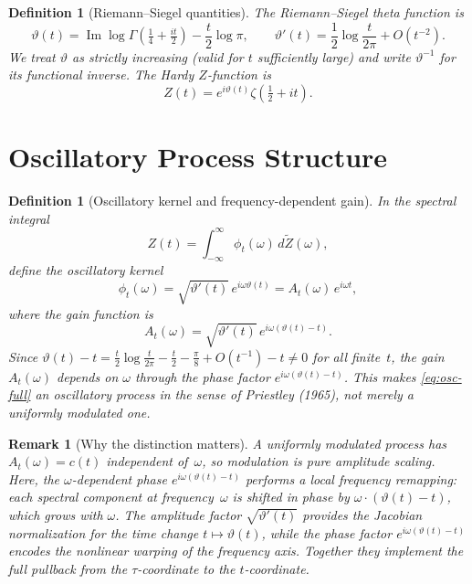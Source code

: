 \documentclass[11pt,a4paper]{article}
\newtheorem{definition}[theorem]{Definition}
\newtheorem{remark}[theorem]{Remark}
\begin{document}
\begin{definition}[Riemann--Siegel quantities]
\label{def:rs}
The Riemann--Siegel theta function is
\begin{equation}
  \vartheta(t)=\operatorname{Im}\log\Gamma\!\left(\tfrac{1}{4}+\tfrac{it}{2}\right)
  -\frac{t}{2}\log\pi,
  \qquad
  \vartheta'(t)=\frac{1}{2}\log\frac{t}{2\pi}+O(t^{-2}).
\end{equation}
We treat $\vartheta$ as strictly increasing (valid for $t$ sufficiently
large) and write $\vartheta^{-1}$ for its functional inverse.
The Hardy $Z$-function is
\begin{equation}
  Z(t)=e^{i\vartheta(t)}\zeta\!\left(\tfrac{1}{2}+it\right).
\end{equation}
\end{definition}


\section{Oscillatory Process Structure}

\begin{definition}[Oscillatory kernel and frequency-dependent gain]
\label{def:oscillatory}
In the spectral integral
\begin{equation}
  \label{eq:osc-full}
  Z(t)=\int_{-\infty}^{\infty}
       \phi_t(\omega)\,d\widetilde{Z}(\omega),
\end{equation}
define the \emph{oscillatory kernel}
\begin{equation}
  \label{eq:phi-def}
  \phi_t(\omega)
  =\sqrt{\vartheta'(t)}\,e^{i\omega\vartheta(t)}
  =A_t(\omega)\,e^{i\omega t},
\end{equation}
where the \emph{gain function} is
\begin{equation}
  \label{eq:gain}
  A_t(\omega)=\sqrt{\vartheta'(t)}\,e^{i\omega(\vartheta(t)-t)}.
\end{equation}
Since $\vartheta(t)-t=\tfrac{t}{2}\log\tfrac{t}{2\pi}-\tfrac{t}{2}
-\tfrac{\pi}{8}+O(t^{-1})-t\neq 0$ for all finite~$t$, the gain
$A_t(\omega)$ depends on $\omega$ through the phase factor
$e^{i\omega(\vartheta(t)-t)}$. This makes \eqref{eq:osc-full} an
\emph{oscillatory process} in the sense of Priestley (1965), not merely
a uniformly modulated one.
\end{definition}

\begin{remark}[Why the distinction matters]
A \emph{uniformly modulated} process has $A_t(\omega)=c(t)$ independent
of~$\omega$, so modulation is pure amplitude scaling. Here, the
$\omega$-dependent phase $e^{i\omega(\vartheta(t)-t)}$ performs a
\emph{local frequency remapping}: each spectral component at
frequency~$\omega$ is shifted in phase by
$\omega\cdot(\vartheta(t)-t)$, which grows with $\omega$.
The amplitude factor $\sqrt{\vartheta'(t)}$ provides the Jacobian
normalization for the time change $t\mapsto\vartheta(t)$, while the
phase factor $e^{i\omega(\vartheta(t)-t)}$ encodes the nonlinear
warping of the frequency axis. Together they implement the full
pullback from the $\tau$-coordinate to the $t$-coordinate.
\end{remark}
\end{document}
